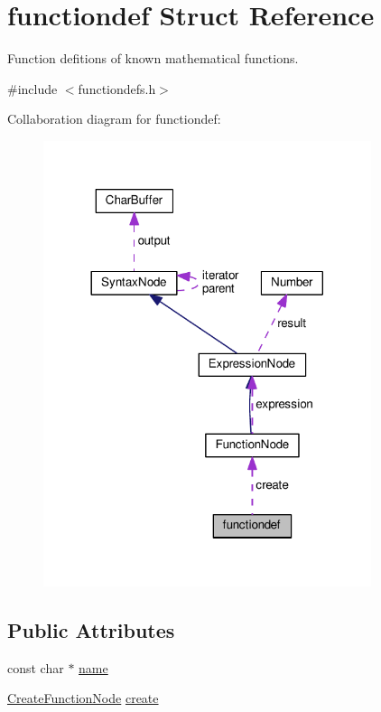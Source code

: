 \hypertarget{structfunctiondef}{}\section{functiondef Struct Reference}
\label{structfunctiondef}


Function defitions of known mathematical functions.  




{\ttfamily \#include $<$functiondefs.\+h$>$}



Collaboration diagram for functiondef\+:
\nopagebreak
\begin{figure}[H]
\begin{center}
\leavevmode
\includegraphics[width=272pt]{d9/dea/structfunctiondef__coll__graph}
\end{center}
\end{figure}
\subsection*{Public Attributes}
\begin{DoxyCompactItemize}
\item 
const char $\ast$ \hyperlink{structfunctiondef_ae17adb6289e2da9d1b68824afe49d210}{name}
\item 
\hyperlink{functiondefs_8h_afdc10d17fe34c7cad02104a3607b2c28}{Create\+Function\+Node} \hyperlink{structfunctiondef_a323f2d4c5ae5923f8f76c76b3c77b42e}{create}
\end{DoxyCompactItemize}


